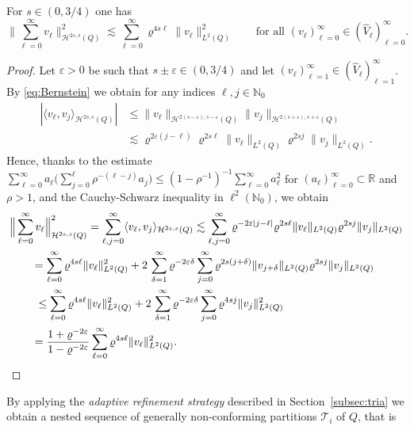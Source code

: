 \documentclass{amsart}
\providecommand{\tria}{\mathcal{T}}
\newcommand{\eps}{\varepsilon}
\newcommand{\cH}{\mathcal H}
\begin{document}
%
\begin{proposition} \label{prop:1} 
For $s \in (0,3/4)$ one has
\begin{equation*}
\Big\|\sum_{\ell=0}^\infty v_\ell\Big\|_{\cH^{2s,s}(Q)}^2 \lesssim \sum_{\ell=0}^\infty \varrho^{4 s \ell} \|v_\ell\|_{L^2(Q)}^2 \qquad \text{for all }(v_\ell)_{\ell=0}^\infty \in (\widehat{V}_\ell)_{\ell=0}^\infty .
\end{equation*}
\end{proposition}

\begin{proof} Let $\eps>0$ be such that $s \pm \eps \in (0,3/4)$ and let $(v_\ell)_{\ell=1}^\infty \in (\widehat{V}_\ell)_{\ell=1}^\infty$. By \eqref{eq:Bernstein} we obtain for any indices $\ell,j\in \mathbb{N}_0$
\begin{align*}
|\langle v_\ell,v_j\rangle_{\cH^{2s,s}(Q)}| &\leq \|v_\ell\|_{\cH^{2(s-\eps),s-\eps}(Q)}\|v_j\|_{\cH^{2(s+\eps),s+\eps}(Q)}\\
& \lesssim \varrho^{2\eps(j-\ell)}  \varrho^{2 s \ell} \|v_\ell\|_{L^2(Q)} \varrho^{2 s j} \|v_j\|_{L^2(Q)}.
\end{align*}
Hence, thanks to the estimate $\sum_{\ell= 0}^\infty a_\ell \big(\sum_{j=0}^\ell \rho^{-(\ell-j)} a_j\big)\leq (1-\rho^{-1})^{-1} \sum_{\ell=0}^\infty a_\ell^2$ for $(a_\ell)_{\ell=0}^\infty \subset \mathbb{R}$ and $\rho >1$, and the Cauchy-Schwarz inequality in $\ell^2(\mathbb{N}_0)$, we obtain
\begin{align*}
&\Big\|\sum_{\ell=0}^\infty v_\ell\Big\|_{\cH^{2s,s}(Q)}^2  = \sum_{\ell,j=0}^\infty \langle v_\ell,v_j\rangle_{\cH^{2s,s}(Q)} \lesssim \sum_{\ell,j=0}^\infty  \varrho^{-2\eps|j-\ell|}  \varrho^{2 s \ell} \|v_\ell\|_{L^2(Q)} \varrho^{2 s j} \|v_j\|_{L^2(Q)} \\
&\qquad = \sum_{\ell=0}^\infty \varrho^{4s\ell} \|v_\ell\|_{L^2(Q)}^2 + 2\, \sum_{\delta = 1}^\infty \varrho^{-2\eps \delta} \sum_{j=0}^\infty \varrho^{2 s (j+\delta)} \|v_{j+\delta}\|_{L^2(Q)} \varrho^{2 s j} \|v_{j}\|_{L^2(Q)}  \\
&\qquad\ \leq \sum_{\ell=0}^\infty \varrho^{4s\ell} \|v_\ell\|_{L^2(Q)}^2 + 2\, \sum_{\delta = 1}^\infty \varrho^{-2\eps \delta}  \sum_{j=0}^\infty \varrho^{4 s j} \|v_{j}\|^2_{L^2(Q)}\\
& \qquad = \frac{1 + \varrho^{-2\eps}}{1-\varrho^{-2\eps}} \sum_{\ell=0}^\infty \varrho^{4s\ell} \|v_\ell\|_{L^2(Q)}^2.\qedhere
\end{align*}
\end{proof}
%
By applying the \emph{adaptive refinement strategy} described in Section~\ref{subsec:tria} we obtain a nested sequence of generally non-conforming partitions $\tria_i$ of $Q$, that is
\end{document}
